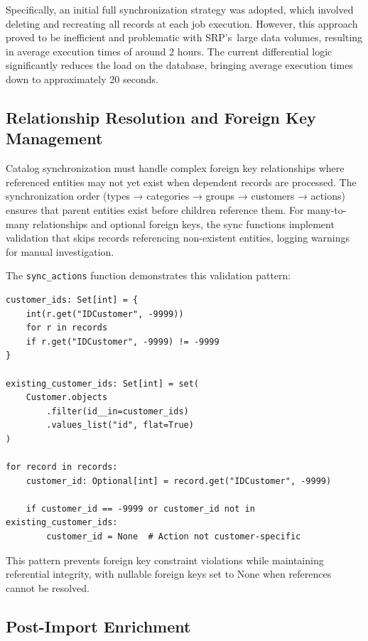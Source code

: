 Specifically, an initial full synchronization strategy was adopted, which involved deleting and recreating all records at each job execution. However, this approach proved to be inefficient and problematic with SRP's~large data volumes, resulting in average execution times of around 2 hours. The current differential logic significantly reduces the load on the database, bringing average execution times down to approximately 20 seconds.

\subsection{Relationship Resolution and Foreign Key Management}

Catalog synchronization must handle complex foreign key relationships where referenced entities may not yet exist when dependent records are processed. The synchronization order (types → categories → groups → customers → actions) ensures that parent entities exist before children reference them. For many-to-many relationships and optional foreign keys, the sync functions implement validation that skips records referencing non-existent entities, logging warnings for manual investigation.

The \texttt{sync\_actions} function demonstrates this validation pattern:

\begin{verbatim}
customer_ids: Set[int] = {
    int(r.get("IDCustomer", -9999))
    for r in records
    if r.get("IDCustomer", -9999) != -9999
}

existing_customer_ids: Set[int] = set(
    Customer.objects
        .filter(id__in=customer_ids)
        .values_list("id", flat=True)
)

for record in records:
    customer_id: Optional[int] = record.get("IDCustomer", -9999)

    if customer_id == -9999 or customer_id not in existing_customer_ids:
        customer_id = None  # Action not customer-specific
\end{verbatim}

This pattern prevents foreign key constraint violations while maintaining referential integrity, with nullable foreign keys set to None when references cannot be resolved.

\subsection{Post-Import Enrichment}

